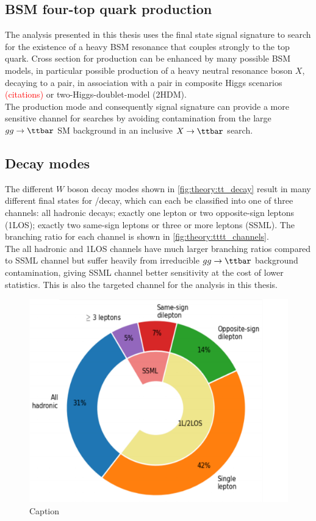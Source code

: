 \documentclass[../thesis.tex]{subfiles}
\begin{document}
\subsection{\acs{BSM} four-top quark production}
\label{sec:4top}
The analysis presented in this thesis uses the \tttt final state signal signature to search for the existence of a heavy \acs{BSM} resonance that couples strongly to the top quark.
Cross section for \tttt production can be enhanced by many possible \acs{BSM} models, in particular possible production of a heavy neutral resonance boson $X$, decaying to a \ttbar pair, in association with a \ttbar pair in composite Higgs scenarios \textcolor{red}{(citations)} or two-Higgs-doublet-model (\acs{2HDM}).\\
The \ttX production mode and consequently \tttt signal signature can provide a more sensitive channel for searches by avoiding contamination from the large $gg\rightarrow \ttbar$ \acs{SM} background in an inclusive $X\rightarrow\ttbar$ search.
\subsection*{Decay modes}
The different $W$ boson decay modes shown in \autoref{fig:theory:tt_decay} result in many different final states for \ttX/\tttt decay, which can each be classified into one of three channels: all hadronic decays; exactly one lepton or two opposite-sign leptons (\acs{1LOS}); exactly two same-sign leptons or three or more leptons (\acs{SSML}). The branching ratio for each channel is shown in \autoref{fig:theory:tttt_channels}.\\
The all hadronic and \acs{1LOS} channels have much larger branching ratios compared to \acs{SSML} channel but suffer heavily from irreducible $gg\rightarrow\ttbar$ background contamination, giving \acs{SSML} channel better sensitivity at the cost of lower statistics. This is also the targeted channel for the analysis in this thesis.

\begin{figure}[!htbp]
\begin{center}
\includegraphics[width=0.7\linewidth]{fig/theory_tttt_channels.png}
\caption{\label{fig:theory:tttt_channels}Caption}
\end{center}
\end{figure}
\end{document}
